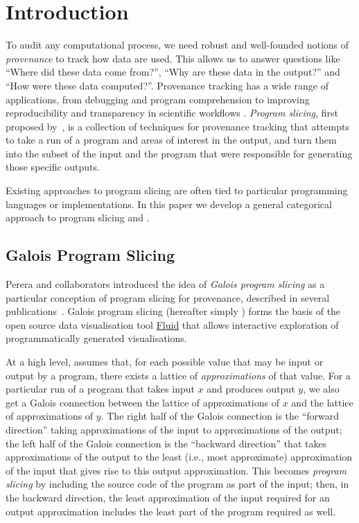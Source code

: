 \section{Introduction}

To audit any computational process, we need robust and well-founded notions of \emph{provenance} to track how data are used. This allows us to answer questions like ``Where did these data come from?'', ``Why are these data in the output?'' and ``How were these data computed?''. Provenance tracking has a wide range of applications, from debugging and program comprehension  to improving reproducibility and transparency in scientific workflows . \emph{Program slicing}, first proposed by~\citet{weiser81}, is a collection of techniques for provenance tracking that attempts to take a run of a program and areas of interest in the output, and turn them into the subset of the input and the program that were responsible for generating those specific outputs.

Existing approaches to program slicing are often tied to particular programming languages or implementations. In this paper we develop a general categorical approach to program slicing and .

\subsection{Galois Program Slicing}
\label{sec:introduction:galois-slicing}

Perera and collaborators introduced the idea of {\em Galois program slicing} as a particular conception of program slicing for provenance, described in several publications~\cite{perera12a,perera16d,ricciotti17}. Galois program slicing (hereafter simply {\emph \GPS}) forms the basis of the open source data visualisation tool \href{https://f.luid.org/}{Fluid} that allows interactive exploration of programmatically generated visualisations.

At a high level, \GPS assumes that, for each possible value that may be input or output by a program, there exists a lattice of {\em approximations} of that value. For a particular run of a program that takes input $x$ and produces output $y$, we also get a Galois connection between the lattice of approximations of $x$ and the lattice of approximations of $y$. The right half of the Galois connection is the ``forward direction'' taking approximations of the input to approximations of the output; the left half of the Galois connection is the ``backward direction'' that takes approximations of the output to the least (i.e., most approximate) approximation of the input that gives rise to this output approximation. This becomes {\em program slicing} by including the source code of the program as part of the input; then, in the backward direction, the least approximation of the input required for an output approximation includes the least part of the program required as well.

